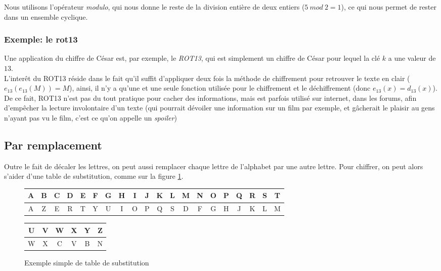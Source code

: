 
Nous utilisons l'opérateur \emph{modulo}, qui nous donne le reste de
la division entière de deux entiers ($5~ mod~ 2 = 1$), ce qui nous
permet de rester dans un ensemble cyclique. \\

\subsubsection{Exemple: le rot13\label{syst:rot13}}
Une application du chiffre de César est, par exemple, le \emph{ROT13},
qui est simplement un chiffre de César pour lequel la clé $k$ a une
valeur de $13$.\\

L'interêt du ROT13 réside dans le fait qu'il suffit d'appliquer deux
fois la méthode de chiffrement pour retrouver le texte en clair
($e_{13}(e_{13}(M)) = M$), ainsi, il n'y a qu'une et une seule fonction utilisée
pour le chiffrement et le déchiffrement (donc $e_{13}(x) =
d_{13}(x)$). \\

De ce fait, ROT13 n'est pas du tout pratique pour cacher des
informations, mais est parfois utilisé sur internet, dans les forums,
afin d'empêcher la lecture involontaire d'un texte (qui pourrait
dévoiler une information sur un film par exemple, et gâcherait le
plaisir au gens n'ayant pas vu le film, c'est ce qu'on appelle un 
\emph{spoiler}) 

\subsection{Par remplacement}
Outre le fait de décaler les lettres, on peut aussi remplacer chaque
lettre de l'alphabet par une autre lettre. Pour chiffrer, on peut alors
s'aider d'une table de substitution, comme sur la figure
\ref{fig:substitutionsimple}.

 \begin{figure}[h]
   \begin{center}
    \begin{tabular}{|c|c|c|c|c|c|c|c|c|c|c|c|c|c|c|c|c|c|c|c}
      \hline
      A & B & C & D & E & F & G & H & I & J & K & L & M & N & O & P &
      Q & R & S & T \\
      \hline
      A & Z & E & R & T & Y & U & I & O & P & Q & S & D & F & G & H &
      J & K & L & M \\
      \hline
    \end{tabular}
  \end{center}
  \begin{flushright}
    \begin{tabular}{c|c|c|c|c|c|}
      \hline
      U & V & W & X & Y & Z \\
      \hline
      W & X & C & V & B & N \\
      \hline
    \end{tabular}
  \end{flushright}
  \caption{Exemple simple de table de substitution}
  \label{fig:substitutionsimple}
\end{figure}

